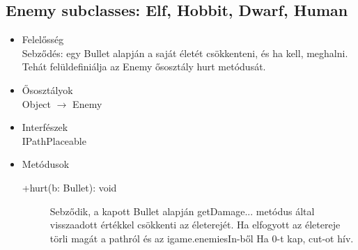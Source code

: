\subsection{Enemy subclasses: Elf, Hobbit, Dwarf, Human}
\begin{itemize}
\item Felelősség\\
Sebződés: egy Bullet alapján a saját életét csökkenteni, és ha kell, meghalni. Tehát felüldefiniálja az Enemy ősosztály hurt metódusát.
\item Ősosztályok\\
Object $\rightarrow$ Enemy
\item Interfészek\\
IPathPlaceable

\item Metódusok
	\begin{description}
		\item[+hurt(b: Bullet): void] Sebződik, a kapott Bullet alapján getDamage... metódus által visszaadott értékkel csökkenti az életerejét. Ha elfogyott az életereje törli magát a pathról és az igame.enemiesIn-ből Ha 0-t kap, cut-ot hív. 
		
	\end{description}
\end{itemize}



